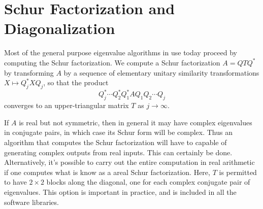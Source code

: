 \section{Schur Factorization and Diagonalization} 
Most of the general purpose eigenvalue algorithms in use today proceed by computing the Schur factorization. We compute a Schur factorization $A= Q TQ^*$ by transforming $A$ by a sequence of elementary unitary similarity transformations $X \mapsto Q_j^* XQ_j$, so that the product 
\begin{equation}
\label{eq: schur form}
Q_j^*\cdots Q_2^* Q_1^*  A Q_1 Q_2 \cdots Q_j    
\end{equation}
converges to an upper-triangular matrix $T$ as $j\to \infty$. 

If $A$ is real but not symmetric, then in general it may have complex eigenvalues in conjugate pairs, in which case its Schur form will be complex. Thus an algorithm that computes the Schur factorization will have to capable of generating complex outputs from real inputs.  This can certainly be done. Alternatively, it's possible to carry out the entire computation in real arithmetic if one computes what is know as a areal Schur factorization. Here, $T$ is permitted to have $2\times 2$ blocks along the diagonal, one for each complex conjugate pair of eigenvalues. This option is important in practice, and is included in all the software libraries.  

